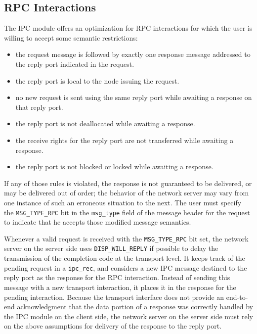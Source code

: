 \subsection{RPC Interactions}
The IPC module offers an optimization for RPC interactions for which
the user is willing to accept some semantic restrictions:
\begin{itemize}
\item the request message is followed by exactly one response message
addressed to the reply port indicated in the request.

\item the reply port is local to the node issuing the request.

\item no new request is sent using the same reply port while awaiting
a response on that reply port.

\item the reply port is not deallocated while awaiting a response.

\item the receive rights for the reply port are not transferred while
awaiting a response.

\item the reply port is not blocked or locked while awaiting a response.
\end{itemize}

If any of those rules is violated, the response is not guaranteed to
be delivered, or may be delivered out of order; the behavior of the
network server may vary from one instance of such an erroneous situation
to the next. The user must specify the \verb"MSG_TYPE_RPC" bit in the
\verb"msg_type" field of the message header for the request to
indicate that he accepts those modified message semantics.

Whenever a valid request is received with the \verb"MSG_TYPE_RPC" bit
set, the network server on the server side uses \verb"DISP_WILL_REPLY"
if possible to delay the transmission of the completion code at the
transport level. It keeps track of the pending request in a
\verb"ipc_rec", and considers a new IPC message destined to the reply
port as the response for the RPC interaction. Instead of sending this
message with a new transport interaction, it places it in the
response for the pending interaction. Because the transport interface
does not provide an end-to-end acknowledgment that the data portion of
a response was correctly handled by the IPC module on the client side,
the network server on the server side must rely on the above
assumptions for delivery of the response to the reply port.

